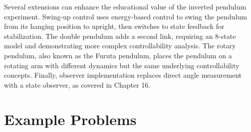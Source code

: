 Several extensions can enhance the educational value of the inverted pendulum experiment. Swing-up control uses energy-based control to swing the pendulum from its hanging position to upright, then switches to state feedback for stabilization. The double pendulum adds a second link, requiring an 8-state model and demonstrating more complex controllability analysis. The rotary pendulum, also known as the Furuta pendulum, places the pendulum on a rotating arm with different dynamics but the same underlying controllability concepts. Finally, observer implementation replaces direct angle measurement with a state observer, as covered in Chapter 16.

\section{Example Problems}

